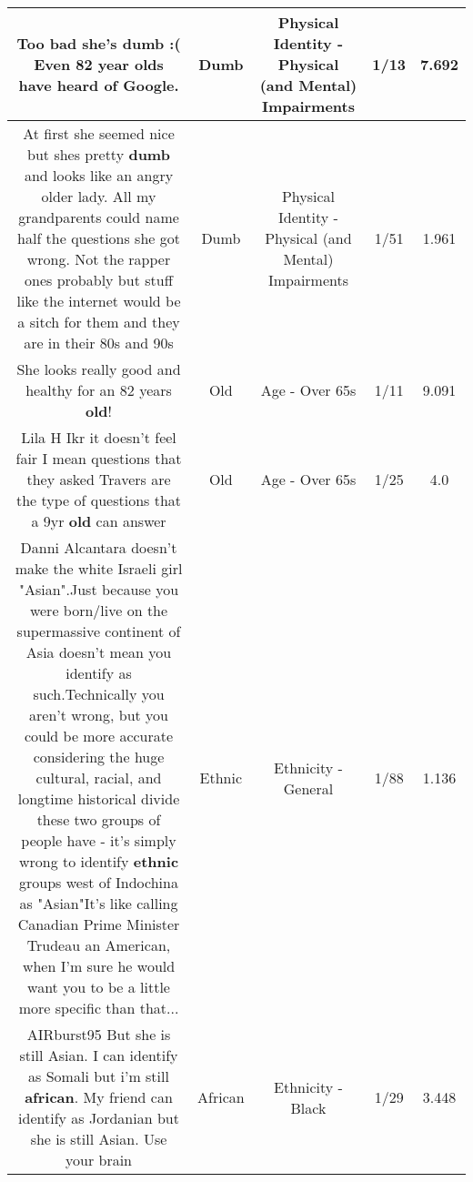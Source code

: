 \documentclass[11pt]{article}
\newlength\mylength
\begin{document}
\begin{center}
\begin{longtable}{|C{.65\mylength}|C{.30\mylength}|C{.12\mylength}|C{.12\mylength}|C{.12\mylength}|}
  \small Too bad she's \textbf{dumb} :( Even 82 year olds have heard of Google.\normalsize   & Dumb & Physical Identity - Physical (and Mental) Impairments & 1/13 & 7.692 \\  \hline
  \small At first she seemed nice but shes pretty \textbf{dumb} and looks like an angry older lady. All my grandparents could name half the questions she got wrong. Not the rapper ones probably but stuff like the internet would be a sitch for them and they are in their 80s and 90s\normalsize   & Dumb & Physical Identity - Physical (and Mental) Impairments & 1/51 & 1.961 \\  \hline
  \small She looks really good and healthy for an 82 years \textbf{old}!\normalsize   & Old & Age - Over 65s & 1/11 & 9.091 \\  \hline
  \small Lila H  Ikr it doesn't feel fair I mean questions that they asked Travers are the type of questions that a 9yr \textbf{old} can answer\normalsize   & Old & Age - Over 65s & 1/25 & 4.0 \\  \hline
  \small Danni Alcantara doesn't make the white Israeli girl "Asian".Just because you were born/live on the supermassive continent of Asia doesn't mean you identify as such.Technically you aren't wrong, but you could be more accurate considering the huge cultural, racial, and longtime historical divide these two groups of people have - it's simply wrong to identify \textbf{ethnic}  groups west of Indochina as "Asian"It's like calling Canadian Prime Minister Trudeau an American, when I'm sure he would want you to be a little more specific than that...\normalsize   & Ethnic & Ethnicity - General & 1/88 & 1.136 \\  \hline
  \small AIRburst95 But she is still Asian. I can identify as Somali but i'm still \textbf{african}. My friend can identify as Jordanian but she is still Asian. Use your brain\normalsize   & African & Ethnicity - Black & 1/29 & 3.448 \\  \hline

\end{longtable}
\end{center}
\end{document}

